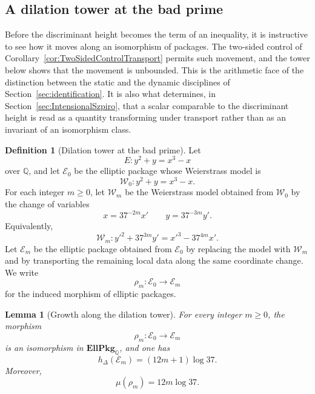 \documentclass[10pt, reqno]{amsart}
\theoremstyle{plain}
\newtheorem{lemma}[theorem]{Lemma}
\theoremstyle{definition}
\newtheorem{definition}[theorem]{Definition}
\theoremstyle{plain}
\newcommand{\Q}{\mathbb{Q}}
\begin{document}
\subsection{A dilation tower at the bad prime}\label{subsec:DilationTower}

Before the discriminant height becomes the term of an inequality, it is instructive to see how it moves along an isomorphism of packages. The two-sided control of Corollary~\ref{cor:TwoSidedControlTransport} permits such movement, and the tower below shows that the movement is unbounded. This is the arithmetic face of the distinction between the static and the dynamic disciplines of Section~\ref{sec:identification}. It is also what determines, in Section~\ref{sec:IntensionalSzpiro}, that a scalar comparable to the discriminant height is read as a quantity transforming under transport rather than as an invariant of an isomorphism class.

\begin{definition}[Dilation tower at the bad prime]\label{def:DilationTowerAtBadPrime}
Let
\[
  E \colon y^2+y=x^3-x
\]
over $\Q$, and let $\mathcal{E}_0$ be the elliptic package whose Weierstrass model is
\[
  \mathcal{W}_0 \colon y^2+y=x^3-x.
\]
For each integer $m\ge 0$, let $\mathcal{W}_m$ be the Weierstrass model obtained from $\mathcal{W}_0$ by the change of variables
\[
  x=37^{-2m}x'
  \qquad
  y=37^{-3m}y'.
\]
Equivalently,
\[
  \mathcal{W}_m \colon y'^2+37^{3m}y'=x'^3-37^{4m}x'.
\]
Let $\mathcal{E}_m$ be the elliptic package obtained from $\mathcal{E}_0$ by replacing the model with $\mathcal{W}_m$ and by transporting the remaining local data along the same coordinate change. We write
\[
  \rho_m \colon \mathcal{E}_0 \longrightarrow \mathcal{E}_m
\]
for the induced morphism of elliptic packages.
\end{definition}

\begin{lemma}[Growth along the dilation tower]\label{lem:DilationTowerGrowth}
For every integer $m\ge 0$, the morphism
\[
  \rho_m \colon \mathcal{E}_0 \longrightarrow \mathcal{E}_m
\]
is an isomorphism in $\mathbf{EllPkg}_{\Q}$, and one has
\[
  h_\Delta(\mathcal{E}_m)=(12m+1)\log 37.
\]
Moreover,
\[
  \mu(\rho_m)=12m\log 37.
\]
\end{lemma}
\end{document}
